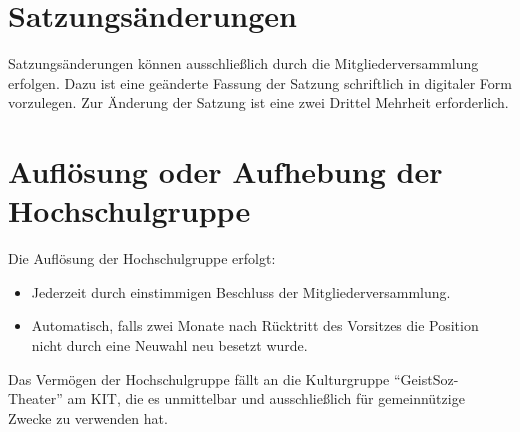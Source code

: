 \documentclass[11pt]{article}
\begin{document}
\section{Satzungsänderungen}
Satzungsänderungen können ausschließlich durch die Mitgliederversammlung erfolgen. Dazu ist eine geänderte Fassung der Satzung schriftlich in digitaler Form vorzulegen. Zur Änderung der Satzung ist eine zwei Drittel Mehrheit erforderlich.
\section{Auflösung oder Aufhebung der Hochschulgruppe}
Die Auflösung der Hochschulgruppe erfolgt:
\begin{itemize}
	\item Jederzeit durch einstimmigen Beschluss der Mitgliederversammlung.
	\item Automatisch, falls zwei Monate nach Rücktritt des Vorsitzes die Position nicht durch eine Neuwahl neu besetzt wurde.
\end{itemize}
Das Vermögen der Hochschulgruppe fällt an die Kulturgruppe ``GeistSoz-Theater'' am KIT, die es unmittelbar und ausschließlich für gemeinnützige
Zwecke zu verwenden hat.
\end{document}
